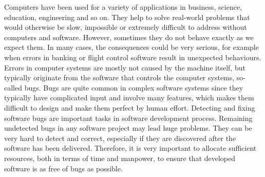 
Computers have been used for a variety of applications in business, science, education, engineering and so on. They help to solve real-world problems that would otherwise be slow, impossible or extremely difficult to address without computers and software. However, sometimes they do not behave exactly as we expect them. In many cases, the consequences could be very serious, for example when errors in banking or flight control software result in unexpected behaviours. Errors in computer systems are mostly not caused by the machine itself, but typically originate from the software that controls the computer systems, so-called bugs. Bugs are quite common in complex software systems since they typically have complicated input and involve many features, which makes them difficult to design and make them perfect by human effort. Detecting and fixing software bugs are important tasks in software development process. Remaining undetected bugs in any software project may lead huge problems. They can be very hard to detect and correct, especially if they are discovered after the software has been delivered. Therefore, it is very important to allocate sufficient resources, both in terms of time and manpower, to ensure that developed software is as free of bugs as possible. 


%
%
%

